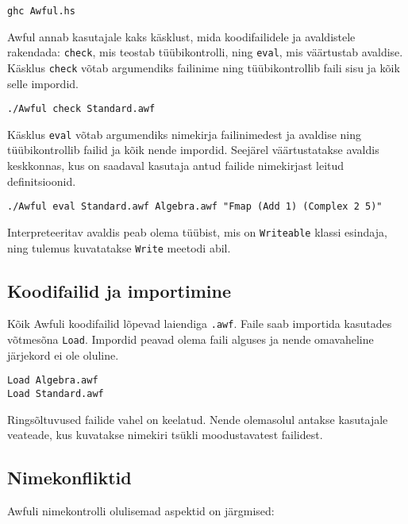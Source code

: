 \documentclass[12pt]{article}
\begin{document}
      \begin{verbatim}ghc Awful.hs\end{verbatim}

      Awful annab kasutajale kaks käsklust, mida koodifailidele ja avaldistele rakendada: \verb!check!, mis teostab tüübikontrolli, ning \verb!eval!, mis väärtustab avaldise. Käsklus \verb!check! võtab argumendiks failinime ning tüübikontrollib faili sisu ja kõik selle impordid.

      \begin{verbatim}./Awful check Standard.awf\end{verbatim}

      Käsklus \verb!eval! võtab argumendiks nimekirja failinimedest ja avaldise ning tüübikontrollib failid ja kõik nende impordid. Seejärel väärtustatakse avaldis keskkonnas, kus on saadaval kasutaja antud failide nimekirjast leitud definitsioonid.

      \begin{verbatim}./Awful eval Standard.awf Algebra.awf "Fmap (Add 1) (Complex 2 5)"\end{verbatim}

      Interpreteeritav avaldis peab olema tüübist, mis on \verb!Writeable! klassi esindaja, ning tulemus kuvatatakse \verb!Write! meetodi abil.
    \subsection{Koodifailid ja importimine}
      Kõik Awfuli koodifailid lõpevad laiendiga \verb!.awf!. Faile saab importida kasutades võtmesõna \verb!Load!. Impordid peavad olema faili alguses ja nende omavaheline järjekord ei ole oluline.

      \begin{verbatim}Load Algebra.awf
Load Standard.awf\end{verbatim}

      Ringsõltuvused failide vahel on keelatud. Nende olemasolul antakse kasutajale veateade, kus kuvatakse nimekiri tsükli moodustavatest failidest.
    \subsection{Nimekonfliktid}
      Awfuli nimekontrolli olulisemad aspektid on järgmised:
\end{document}
